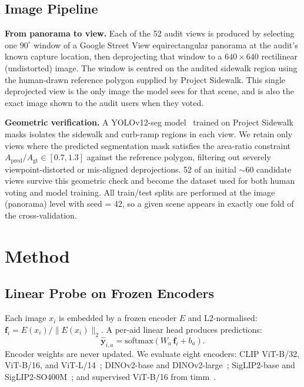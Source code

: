 \documentclass[conference]{IEEEtran}
\begin{document}
\subsection{Image Pipeline}
\label{sec:data:pipeline}

\textbf{From panorama to view.} Each of the 52 audit views is produced by selecting one $90^\circ$ window of a Google Street View equirectangular panorama at the audit's known capture location, then deprojecting that window to a $640\times640$ rectilinear (undistorted) image. The window is centred on the audited sidewalk region using the human-drawn reference polygon supplied by Project Sidewalk. This single deprojected view is the only image the model sees for that scene, and is also the exact image shown to the audit users when they voted.

\textbf{Geometric verification.} A YOLOv12-seg model~\cite{tian2025yolov12attentioncentricrealtimeobject} trained on Project Sidewalk masks isolates the sidewalk and curb-ramp regions in each view. We retain only views where the predicted segmentation mask satisfies the area-ratio constraint $A_{\mathrm{pred}}/A_{\mathrm{gt}} \in [0.7, 1.3]$ against the reference polygon, filtering out severely viewpoint-distorted or mis-aligned deprojections. 52 of an initial $\sim$60 candidate views survive this geometric check and become the dataset used for both human voting and model training. All train/test splits are performed at the image (panorama) level with seed = 42, so a given scene appears in exactly one fold of the cross-validation.

\FloatBarrier
\section{Method}
\label{sec:method}

\subsection{Linear Probe on Frozen Encoders}

Each image $x_i$ is embedded by a frozen encoder $E$ and L2-normalised: $\mathbf{f}_i = E(x_i)/\|E(x_i)\|_2$. A per-aid linear head produces predictions:
\begin{equation}
\hat{\mathbf{y}}_{i,a} = \mathrm{softmax}(W_a\,\mathbf{f}_i + b_a).
\end{equation}
Encoder weights are never updated. We evaluate eight encoders: CLIP ViT-B/32, ViT-B/16, and ViT-L/14~\cite{radford2021learningtransferablevisualmodels}; DINOv2-base and DINOv2-large~\cite{oquab2023dinov2}; SigLIP2-base and SigLIP2-SO400M~\cite{tschannen2025siglip2}; and supervised ViT-B/16 from timm~\cite{dosovitskiy2021an}.
\end{document}
